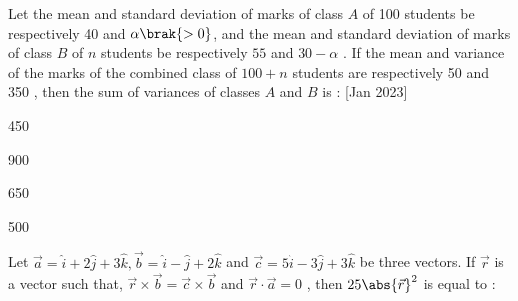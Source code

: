 \iffalse
  \title{2021}
  \author{EE24BTECH11010}
  \section{mcq-single}
\fi
 \item Let the mean and standard deviation of marks of class $A$ of 100 students be respectively 40 and $\alpha \brak{>0}$, and the mean and standard deviation of marks of class $B$
 of $n$
 students be respectively $55$ and $30-\alpha$ 
. If the mean and variance of the marks of the combined class of $100 + n$
 students are respectively 50 and 350 , then the sum of variances of classes $A$
 and $B$
 is : \hfill [Jan 2023]
 \begin{enumerate}
     \begin{multicols}{2}
     \item 450
     \item 900
     \item 650 
     \item 500
     \end{multicols}
 \end{enumerate}
\item Let $\vec{a} = \hat{i} + 2\hat{j}+3\hat{k}, \vec{b} = \hat{i} - \hat{j}+ 2\hat{k}$
 and $\vec{c} = 5\hat{i} - 3\hat{j} + 3\hat{k}$
 be three vectors. If $\vec{r}$
 is a vector such that, $\vec{r} \times \vec{b} = \vec{c} \times \vec{b}$
 and $\vec{r} \cdot \vec{a} = 0$
, then $25\abs{\vec{r}}^2$
 is equal to : 
 
